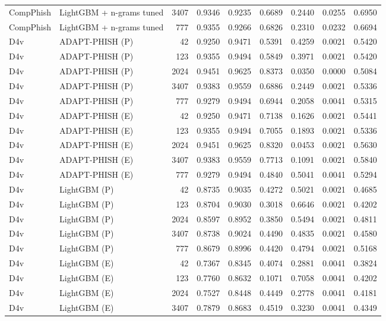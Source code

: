 \begin{table}[t]
\begin{tabular}{llrrrrrrr}
CompPhish & LightGBM + n-grams tuned & 3407 & 0.9346 & 0.9235 & 0.6689 & 0.2440 & 0.0255 & 0.6950 \\
CompPhish & LightGBM + n-grams tuned & 777 & 0.9355 & 0.9266 & 0.6826 & 0.2310 & 0.0232 & 0.6694 \\
D4v & ADAPT-PHISH (P) & 42 & 0.9250 & 0.9471 & 0.5391 & 0.4259 & 0.0021 & 0.5420 \\
D4v & ADAPT-PHISH (P) & 123 & 0.9355 & 0.9494 & 0.5849 & 0.3971 & 0.0021 & 0.5420 \\
D4v & ADAPT-PHISH (P) & 2024 & 0.9451 & 0.9625 & 0.8373 & 0.0350 & 0.0000 & 0.5084 \\
D4v & ADAPT-PHISH (P) & 3407 & 0.9383 & 0.9559 & 0.6886 & 0.2449 & 0.0021 & 0.5336 \\
D4v & ADAPT-PHISH (P) & 777 & 0.9279 & 0.9494 & 0.6944 & 0.2058 & 0.0041 & 0.5315 \\
D4v & ADAPT-PHISH (E) & 42 & 0.9250 & 0.9471 & 0.7138 & 0.1626 & 0.0021 & 0.5441 \\
D4v & ADAPT-PHISH (E) & 123 & 0.9355 & 0.9494 & 0.7055 & 0.1893 & 0.0021 & 0.5336 \\
D4v & ADAPT-PHISH (E) & 2024 & 0.9451 & 0.9625 & 0.8320 & 0.0453 & 0.0021 & 0.5630 \\
D4v & ADAPT-PHISH (E) & 3407 & 0.9383 & 0.9559 & 0.7713 & 0.1091 & 0.0021 & 0.5840 \\
D4v & ADAPT-PHISH (E) & 777 & 0.9279 & 0.9494 & 0.4840 & 0.5041 & 0.0041 & 0.5294 \\
D4v & LightGBM (P) & 42 & 0.8735 & 0.9035 & 0.4272 & 0.5021 & 0.0021 & 0.4685 \\
D4v & LightGBM (P) & 123 & 0.8704 & 0.9030 & 0.3018 & 0.6646 & 0.0021 & 0.4202 \\
D4v & LightGBM (P) & 2024 & 0.8597 & 0.8952 & 0.3850 & 0.5494 & 0.0021 & 0.4811 \\
D4v & LightGBM (P) & 3407 & 0.8738 & 0.9024 & 0.4490 & 0.4835 & 0.0021 & 0.4580 \\
D4v & LightGBM (P) & 777 & 0.8679 & 0.8996 & 0.4420 & 0.4794 & 0.0021 & 0.5168 \\
D4v & LightGBM (E) & 42 & 0.7367 & 0.8345 & 0.4074 & 0.2881 & 0.0041 & 0.3824 \\
D4v & LightGBM (E) & 123 & 0.7760 & 0.8632 & 0.1071 & 0.7058 & 0.0041 & 0.4202 \\
D4v & LightGBM (E) & 2024 & 0.7527 & 0.8448 & 0.4449 & 0.2778 & 0.0041 & 0.4181 \\
D4v & LightGBM (E) & 3407 & 0.7879 & 0.8683 & 0.4519 & 0.3230 & 0.0041 & 0.4349 \\

\end{tabular}
\end{table}
